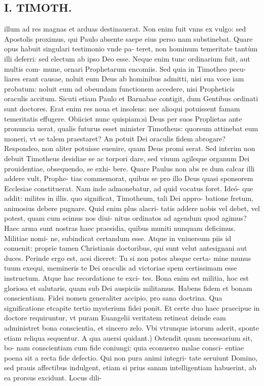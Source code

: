 \documentclass{article}
\begin{document}
\begin{pages}
\section*{I. TIMOTH. }
\marginpar{[ p.14 ]}\pstart illum ad res magnas et arduas destinauerat. Non enim fuit vnns ex vulgo: sed Apostolis proximus, qui Paulo absente saepe eius perso nam substinebat. Quare opus habuit singulari testimonio vnde pa- teret, non hominum temeritate tantùm illi deferri: sed electum ab ipso Deo esse. Neque enim tunc ordinarium fuit, aut multis com- mune, ornari Prophetarum encomiis. Sed quia in Timotheo pecu- liares erant causae, noluit eum Deus ab hominibus admitti, nisi sua voce iam probatum: noluit eum ad obeundam functionem accedere, nisi Propheticis oraculis accitum. Sicuti etiam Paulo et Barnabae contigit, dum Gentibus ordinati sunt doctores. Erat enim res noua et insolens: nec alioqui potuissent famam temeritatis effugere. Obiiciet nunc quispiam:si Deus per suos Proplietas ante pronuncia uerat, qualis futurus esset minister Timotheus: quorsum attinebat eum moneri, vt se talem praestaret? An potuit Dei oraculis fidem abrogare? Respondeo, non aliter potuisse euenire, quam Deus promi serat. Sed interim non debuit Timotheus desidiae se ac torpori dare, sed viuum agileque organum Dei prouidentiae, obsequendo, se exhi- bere. Quare Paulus non abs re dum calcar illi addere vult, Prophe- tias commemorat, quibus se pro illo Deus quasi sponsorem Ecclesiae constituerat. Nam inde admonebatur, ad quid vocatus foret. Ideó- que addit: milites in illis. quo significat, Timotheum, tali Dei appro- batione fretum, animosius debere pugnare. Quid enim plus alacri- tatis addere nobis vel debet, vel potest, quam cum scimus nos diui- nitus ordinatos ad agendum quod agimus? Haec arma sunt nostras haec praesidia, quibus muniti nunquam deficimus. Militiae nomi- ne, subindicat certandum esse. Atque in vniuersum piis id conuenit: proprie tamen Christianis doctoribus, qui sunt velut antesignani aut duces. Perinde ergo est, acsi diceret: Tu si non potes absque certa- mine munus tuum exequi, memineris te Dei oraculis ad victoriae spem certissimam esse instructum. Atque hac recordatione te exci- tes. Bona enim est militia, hoc est gloriosa et salutaris, quam sub Dei auspiciis militamus.  \pend\pstart Habens fidem et bonam conscientiam. Fidei nomen generaliter accipio, pro sana doctrina. Qua significatione etcapite tertio mysterium fidei ponit. Et certe duo haec praecipue in doctore requiruntur, vt puram Euangelii veritatem retineat deinde eam administret bona conscientia, et sincero zelo. Vbi vtrunque istorum aderit, sponte etiam reliqua sequentur. A qua auersi quidant.) Ostendit quam necessarium sit, bo- nam conscientiam cum fide coniungi: quia econuerso malae consci- entiae poena sit a recta fide defectio. Qui non pura animi integri- tate seruiunt Domino, sed prauis affectibus indulgent, etiam si prius sanam intelligentiam habuerint, ab ea prorsus excidunt. Locus dili-  \pend

\end{pages}
\end{document}
